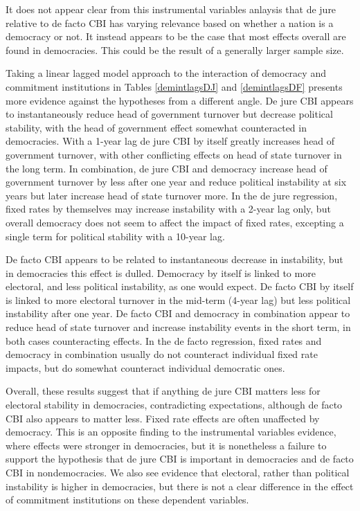 \documentclass{article}
\begin{document}
    It does not appear clear from this instrumental variables anlaysis that de jure relative to de facto CBI has varying relevance based on whether a nation is a democracy or not. It instead appears to be the case that most effects overall are found in democracies. This could be the result of a generally larger sample size.

    Taking a linear lagged model approach to the interaction of democracy and commitment institutions in Tables \ref*{demintlagsDJ} and \ref*{demintlagsDF} presents more evidence against the hypotheses from a different angle. De jure CBI appears to instantaneously reduce head of government turnover but decrease political stability, with the head of government effect somewhat counteracted in democracies. With a 1-year lag de jure CBI by itself greatly increases head of government turnover, with other conflicting effects on head of state turnover in the long term. In combination, de jure CBI and democracy increase head of government turnover by less after one year and reduce political instability at six years but later increase head of state turnover more. In the de jure regression, fixed rates by themselves may increase instability with a 2-year lag only, but overall democracy does not seem to affect the impact of fixed rates, excepting a single term for political stability with a 10-year lag.

    De facto CBI appears to be related to instantaneous decrease in instability, but in democracies this effect is dulled. Democracy by itself is linked to more electoral, and less political instability, as one would expect. De facto CBI by itself is linked to more electoral turnover in the mid-term (4-year lag) but less political instability after one year.  De facto CBI and democracy in combination appear to reduce head of state turnover and increase instability events in the short term, in both cases counteracting effects. In the de facto regression, fixed rates and democracy in combination usually do not counteract individual fixed rate impacts, but do somewhat counteract individual democratic ones.

    Overall, these results suggest that if anything de jure CBI matters less for electoral stability in democracies, contradicting expectations, although de facto CBI also appears to matter less. Fixed rate effects are often unaffected by democracy. This is an opposite finding to the instrumental variables evidence, where effects were stronger in democracies, but it is nonetheless a failure to support the hypothesis that de jure CBI is important in democracies and de facto CBI in nondemocracies. We also see evidence that electoral, rather than political instability is higher in democracies, but there is not a clear difference in the effect of commitment institutions on these dependent variables.
\end{document}
